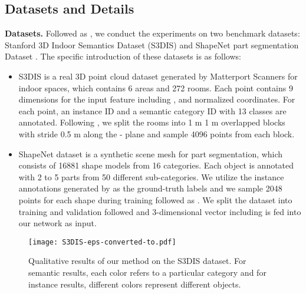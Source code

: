 \documentclass{cta-author}
\begin{document}
\subsection{Datasets and Details}
\noindent \textbf{Datasets.} Followed as \cite{wang2019associatively}, we conduct the experiments on two benchmark datasets: Stanford 3D Indoor Semantics Dataset (S3DIS) \cite{armeni20163d} and ShapeNet part segmentation Dataset \cite{yi2016scalable}. The specific introduction of these datasets is as follows:
\begin{itemize}
\item S3DIS is a real 3D point cloud dataset generated by Matterport Scanners for indoor spaces, which contains 6 areas and 272 rooms. Each point contains 9 dimensions for the input feature including ,  and normalized coordinates. For each point, an instance ID and a semantic category ID with 13 classes are annotated. Following \cite{qi2017pointnet}, we split the rooms into 1 m  1 m overlapped blocks with stride 0.5 m along the - plane and sample 4096 points from each block.
\item ShapeNet dataset is a synthetic scene mesh for part segmentation, which consists of 16881 shape models from 16 categories. Each object is annotated with 2 to 5 parts from 50 different sub-categories. We utilize the instance annotations generated by \cite{wang2018sgpn} as the ground-truth labels and we sample 2048 points for each shape during training followed as \cite{qi2017pointnet}. We split the dataset into training and validation followed \cite{wang2019associatively} and 3-dimensional vector including  is fed into our network as input.
\end{itemize}
\begin{figure*}[h]
  \begin{center}
   \centerline{\texttt{[image: S3DIS-eps-converted-to.pdf]}}
  \end{center}
  \caption{Qualitative results of our method on the S3DIS dataset. For semantic results, each color refers to a particular category and for instance results, different colors represent different objects. }
  \label{fig4}
\end{figure*}
\end{document}

